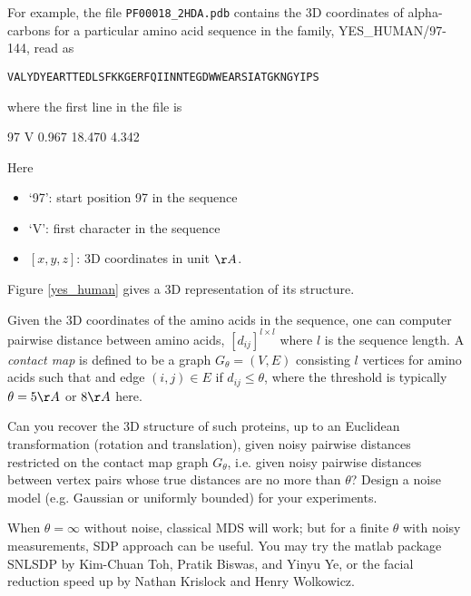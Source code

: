 \documentclass[11pt]{article}
\begin{document}
\begin{enumerate}
For example, the file {\tt PF00018\_2HDA.pdb} contains the 3D coordinates of alpha-carbons for a particular amino acid sequence in the family, YES\_HUMAN/97-144, read as

{\tt{VALYDYEARTTEDLSFKKGERFQIINNTEGDWWEARSIATGKNGYIPS}}

\noindent where the first line in the file is 

97	V	0.967	18.470	4.342

\noindent Here
\begin{itemize}
\item `97': start position 97 in the sequence
\item `V': first character in the sequence
\item $[x,y,z]$: 3D coordinates in unit $\AA$.
\end{itemize}

\noindent Figure \ref{yes_human} gives a 3D representation of its structure. 


Given the 3D coordinates of the amino acids in the sequence, one can computer pairwise distance between amino acids, $[d_{ij}]^{l\times l}$ where $l$ is the sequence length. A \emph{contact map} is defined to be a graph $G_\theta=(V,E)$ consisting $l$ vertices for amino acids such that and edge $(i,j)\in E$ if $d_{ij} \leq \theta$, where the threshold is typically $\theta=5\AA$ or $8\AA$ here. 

Can you recover the 3D structure of such proteins, up to an Euclidean transformation (rotation and translation), given noisy pairwise distances restricted on the contact map graph $G_\theta$, i.e. given noisy pairwise distances between vertex pairs whose true distances are no more than $\theta$? Design a noise model (e.g. Gaussian or uniformly bounded) for your experiments. 

When $\theta=\infty$ without noise, classical MDS will work; but for a finite $\theta$ with noisy measurements, SDP approach can be useful. You may try the matlab package SNLSDP by Kim-Chuan Toh, Pratik Biswas, and Yinyu Ye, or the facial reduction speed up by Nathan Krislock and Henry Wolkowicz. 


\end{enumerate}
\end{document}
